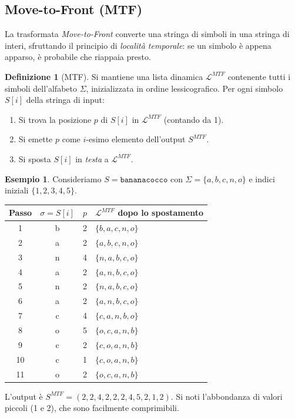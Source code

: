 \documentclass[12pt, a4paper, oneside]{book}
\theoremstyle{plain}
\theoremstyle{definition}
\newtheorem{definizione}[teorema]{Definizione}
\newtheorem{esempio}[teorema]{Esempio}
\theoremstyle{remark}
\begin{document}
\subsection{Move-to-Front (MTF)}
\label{subsec:mtf}

La trasformata \emph{Move-to-Front} converte una stringa di simboli in una stringa di interi, sfruttando il principio di \emph{località temporale}: se un simbolo è appena apparso, è probabile che riappaia presto.

\begin{definizione}[MTF]
Si mantiene una lista dinamica $\mathcal{L}^{MTF}$ contenente tutti i simboli dell'alfabeto $\Sigma$, inizializzata in ordine lessicografico. Per ogni simbolo $S[i]$ della stringa di input:
\begin{enumerate}
  \item Si trova la posizione $p$ di $S[i]$ in $\mathcal{L}^{MTF}$ (contando da 1).
  \item Si emette $p$ come $i$-esimo elemento dell'output $S^{MTF}$.
  \item Si sposta $S[i]$ in \emph{testa} a $\mathcal{L}^{MTF}$.
\end{enumerate}
\end{definizione}

\begin{esempio}
Consideriamo $S = \texttt{bananacocco}$ con $\Sigma = \{a, b, c, n, o\}$ e indici iniziali $\{1, 2, 3, 4, 5\}$.

\begin{center}
\begin{tabular}{c|c|c|l}
\textbf{Passo} & $\sigma = S[i]$ & $p$ & $\mathcal{L}^{MTF}$ dopo lo spostamento \\
\hline
1  & b & 2 & $\{b, a, c, n, o\}$ \\
2  & a & 2 & $\{a, b, c, n, o\}$ \\
3  & n & 4 & $\{n, a, b, c, o\}$ \\
4  & a & 2 & $\{a, n, b, c, o\}$ \\
5  & n & 2 & $\{n, a, b, c, o\}$ \\
6  & a & 2 & $\{a, n, b, c, o\}$ \\
7  & c & 4 & $\{c, a, n, b, o\}$ \\
8  & o & 5 & $\{o, c, a, n, b\}$ \\
9  & c & 2 & $\{c, o, a, n, b\}$ \\
10 & c & 1 & $\{c, o, a, n, b\}$ \\
11 & o & 2 & $\{o, c, a, n, b\}$ \\
\end{tabular}
\end{center}

L'output è $S^{MTF} = (2, 2, 4, 2, 2, 2, 4, 5, 2, 1, 2)$. Si noti l'abbondanza di valori piccoli (1 e 2), che sono facilmente comprimibili.
\end{esempio}
\end{document}
